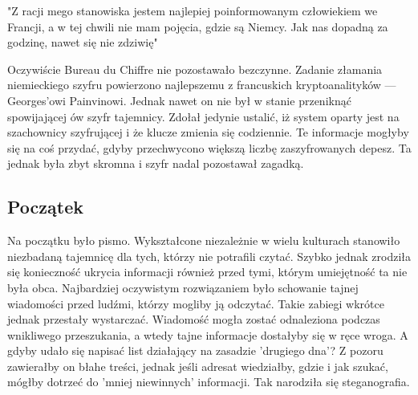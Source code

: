 \documentclass[10pt, a4paper, titlepage]{article}
\begin{document}
\begin{center}
"Z racji mego stanowiska jestem najlepiej poinformowanym człowiekiem we Francji, a w tej chwili nie mam pojęcia, gdzie są Niemcy. Jak nas dopadną za godzinę, nawet się nie zdziwię"\cite{[1]}
\end{center}
Oczywiście Bureau du Chiffre nie pozostawało bezczynne. Zadanie złamania niemieckiego szyfru powierzono najlepszemu z francuskich kryptoanalityków — Georges’owi Painvinowi. Jednak nawet on nie był w stanie przeniknąć spowijającej ów szyfr tajemnicy. Zdołał jedynie ustalić, iż system oparty jest na szachownicy szyfrującej i że klucze zmienia się codziennie. Te informacje mogłyby się na coś przydać, gdyby przechwycono większą liczbę zaszyfrowanych depesz. Ta jednak była zbyt skromna i szyfr nadal pozostawał zagadką.

\subsection{Początek}
Na początku było pismo. Wykształcone niezależnie w wielu kulturach stanowiło niezbadaną tajemnicę dla tych, którzy nie potrafili czytać. Szybko jednak zrodziła się konieczność ukrycia informacji również przed tymi, którym umiejętność ta nie była obca. Najbardziej oczywistym rozwiązaniem było schowanie tajnej wiadomości przed ludźmi, którzy mogliby ją odczytać. Takie zabiegi wkrótce jednak przestały wystarczać. Wiadomość mogła zostać odnaleziona podczas wnikliwego przeszukania, a wtedy tajne informacje dostałyby się w ręce wroga. A gdyby udało się napisać list działający na zasadzie 'drugiego dna'? Z pozoru zawierałby on błahe treści, jednak jeśli adresat wiedziałby, gdzie i jak szukać, mógłby dotrzeć do 'mniej niewinnych' informacji. Tak narodziła się steganografia.
\end{document}
